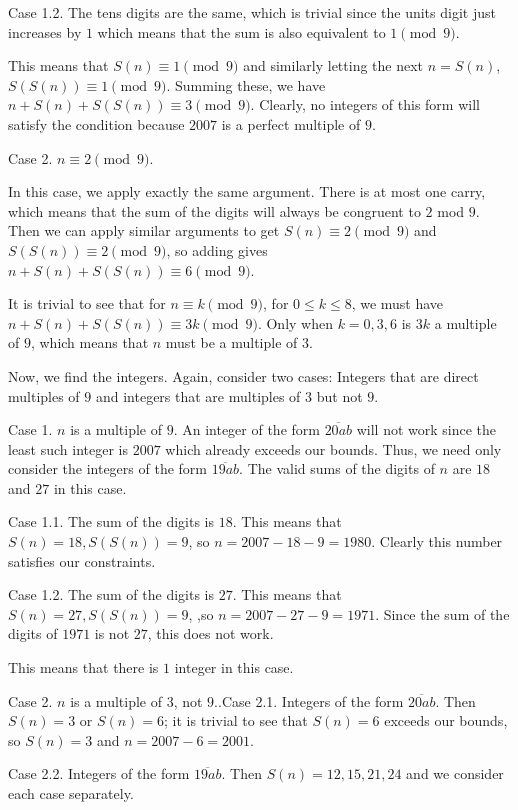 \begin{enumerate}
 Case 1.2. The tens digits are the same, which is trivial since the units digit just increases by $1$ which means that the sum is also equivalent to $1 \pmod 9$.

 This means that $S(n) \equiv 1 \pmod 9$ and similarly letting the next $n=S(n)$, $S(S(n)) \equiv 1 \pmod 9$. Summing these, we have $n+S(n)+S(S(n)) \equiv 3 \pmod 9$. Clearly, no integers of this form will satisfy the condition because $2007$ is a perfect multiple of $9$.

 Case 2. $n \equiv 2 \pmod 9$.

 In this case, we apply exactly the same argument. There is at most one carry, which means that the sum of the digits will always be congruent to $2$ mod $9$. Then we can apply similar arguments to get $S(n) \equiv 2 \pmod 9$ and $S(S(n)) \equiv 2 \pmod 9$, so adding gives $n+S(n)+S(S(n)) \equiv 6 \pmod 9$.

 It is trivial to see that for $n \equiv k \pmod 9$, for $0 \leq k \leq 8$, we must have $n+S(n)+S(S(n)) \equiv 3k \pmod 9$. Only when $k=0, 3, 6$ is $3k$ a multiple of $9$, which means that $n$ must be a multiple of $3$.

 Now, we find the integers. Again, consider two cases: Integers that are direct multiples of $9$ and integers that are multiples of $3$ but not $9$.

 Case 1. $n$ is a multiple of $9$. An integer of the form $\overline{20ab}$ will not work since the least such integer is $2007$ which already exceeds our bounds. Thus, we need only consider the integers of the form $\overline{19ab}$. The valid sums of the digits of $n$ are $18$ and $27$ in this case.

 Case 1.1. The sum of the digits is $18$. This means that $S(n)=18, S(S(n))=9$, so $n=2007-18-9=1980$. Clearly this number satisfies our constraints.

 Case 1.2. The sum of the digits is $27$. This means that $S(n)=27, S(S(n))=9$, ,so $n=2007-27-9=1971$. Since the sum of the digits of $1971$ is not $27$, this does not work.

 This means that there is $1$ integer in this case.

 Case 2. $n$ is a multiple of $3$, not $9$..Case 2.1. Integers of the form $\overline{20ab}$. Then $S(n)=3$ or $S(n)=6$; it is trivial to see that $S(n)=6$ exceeds our bounds, so $S(n)=3$ and $n=2007-6=2001$.

 Case 2.2. Integers of the form $\overline{19ab}$. Then $S(n)=12, 15, 21, 24$ and we consider each case separately.


\end{enumerate}

